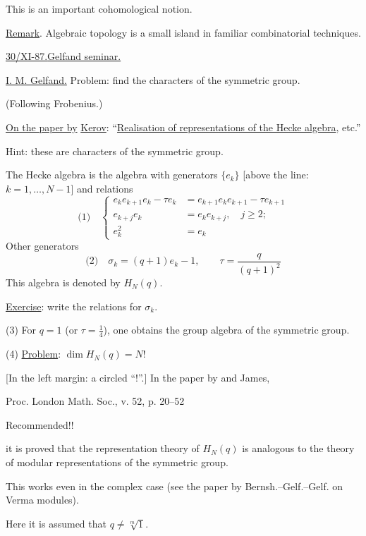 This is an important cohomological notion.

\underline{Remark}. Algebraic topology is a small island in familiar
combinatorial techniques.


\underline{\underline{30/XI-87.}}\qquad \underline{Gelfand seminar.}

\underline{I. M. Gelfand.} Problem: find the characters of the symmetric group.

(Following Frobenius.)

\underline{On the paper by} \underline{Kerov}: ``\underline{Realisation of representations of the Hecke algebra}, etc.''

Hint: these are characters of the symmetric group.

The Hecke algebra is the algebra with generators $\{e_k\}$
[above the line: $k=1,\ldots,N-1$] and relations
\begin{equation*}
\text{(1)}\quad
\left\{\begin{aligned}
e_k e_{k+1}e_k-\tau e_k&=e_{k+1}e_k e_{k+1}-\tau e_{k+1}\\
e_{k+j}e_k&=e_k e_{k+j},\quad j\geq 2;\\
e_k^2&=e_k
\end{aligned}\right.
\end{equation*}
Other generators
\begin{equation*}
\text{(2)}\quad \sigma_k=(q+1)e_k-1,\qquad \tau=\frac{q}{(q+1)^2}
\end{equation*}
This algebra is denoted by $H_N(q)$.

\underline{Exercise}: write the relations for $\sigma_k$.

(3) For $q=1$ (or $\tau=\frac14$), one obtains the group algebra of the symmetric group.

(4) \underline{Problem}: $\dim H_N(q)=N!$

[In the left margin: a circled ``!''.]
In the paper by  and James,

Proc. London Math. Soc., v. 52, p. 20--52

Recommended!!

it is proved that the representation theory of $H_N(q)$ is analogous to the theory of modular
representations of the symmetric group.

This works even in the complex case (see the paper by Bernsh.--Gelf.--Gelf.
on Verma modules).

Here it is assumed that $q\ne\sqrt[m]{1}$.

